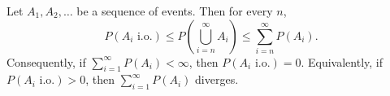 Let $A_1, A_2, \ldots$ be a sequence of events. Then for every $n$,
$$P(A_i \text{ i.o.}) \leq P\left(\bigcup_{i=n}^{\infty} A_i\right) \leq \sum_{i=n}^{\infty} P(A_i).$$
Consequently, if $\sum_{i=1}^{\infty} P(A_i) < \infty$, then $P(A_i \text{ i.o.}) = 0$.
Equivalently, if $P(A_i \text{ i.o.}) > 0$, then $\sum_{i=1}^{\infty} P(A_i)$ diverges.
